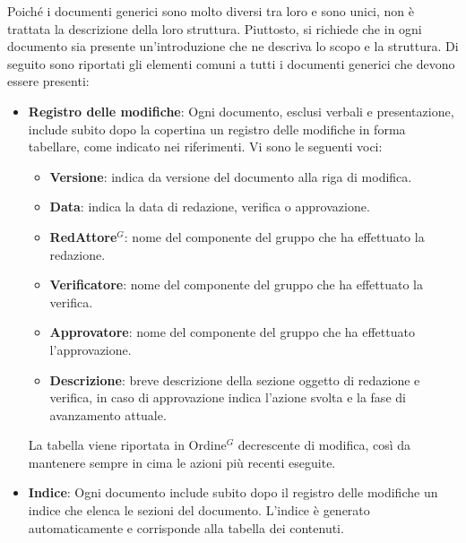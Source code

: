 Poiché i documenti generici sono molto diversi tra loro e sono unici, non è
trattata la descrizione della loro struttura. Piuttosto, si richiede che in ogni
documento sia presente un'introduzione che ne descriva lo scopo e la struttura.
Di seguito sono riportati gli elementi comuni a tutti i documenti generici che
devono essere presenti:
\begin{itemize}
	\item \textbf{Registro delle modifiche}:
	      Ogni documento, esclusi verbali e presentazione, include subito dopo
	      la copertina un registro delle modifiche in forma tabellare, come
	      indicato nei riferimenti. Vi sono le seguenti voci:
	      \begin{itemize}
		      \item \textbf{Versione}: indica da versione del documento alla
		            riga di modifica.
		      \item \textbf{Data}: indica la data di redazione, verifica o
		            approvazione.
		      \item \textbf{Red\gls{Attore}$^G$}: nome del componente del gruppo che ha
		            effettuato la redazione.
		      \item \textbf{Verificatore}: nome del componente del gruppo che ha
		            effettuato la verifica.
		      \item \textbf{Approvatore}: nome del componente del gruppo che ha
		            effettuato l'approvazione.
		      \item \textbf{Descrizione}: breve descrizione della sezione
		            oggetto di redazione e verifica, in caso di approvazione
		            indica l'azione svolta e la fase di avanzamento attuale.
	      \end{itemize}
	      \noindent
	      La tabella viene riportata in \gls{Ordine}$^G$ decrescente di modifica, così da
	      mantenere sempre in cima le azioni più recenti eseguite.

	\item \textbf{Indice}:
	      Ogni documento include subito dopo il registro delle modifiche un
	      indice che elenca le sezioni del documento. L'indice è generato
	      automaticamente e corrisponde alla tabella dei contenuti.


\end{itemize}
